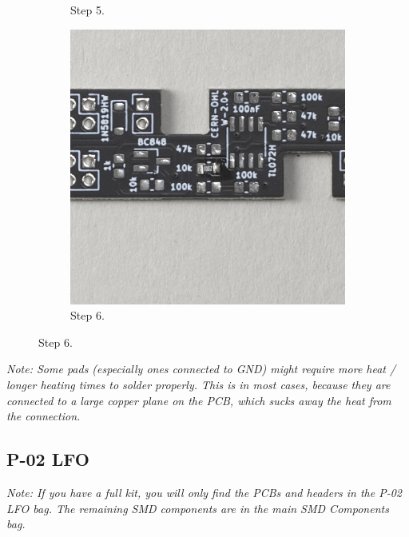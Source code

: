 \documentclass[12pt, a4paper]{article}
\begin{document}
\begin{figure}[H]
\begin{subfigure}{0.3\textwidth}
        \caption*{Step 5.}
    \end{subfigure}
    \hspace{2mm}
    \begin{subfigure}{0.3\textwidth}
        \includegraphics[width=\textwidth]{images/02_06_allpads_soldered.jpg}
        \caption*{Step 6.}
    \end{subfigure}
\end{figure}
\label{fig:step4-6}

\textit{Note: Some pads (especially ones connected to GND) might require more heat / longer
heating times to solder properly. This is in most cases, because they are connected to a large
copper plane on the PCB, which sucks away the heat from the connection.}

\pagebreak
\subsection{P-02 LFO}

\textit{Note: If you have a full kit, you will only find the PCBs and headers in the P-02 LFO
bag. The remaining SMD components are in the main SMD Components bag.}
\end{document}
